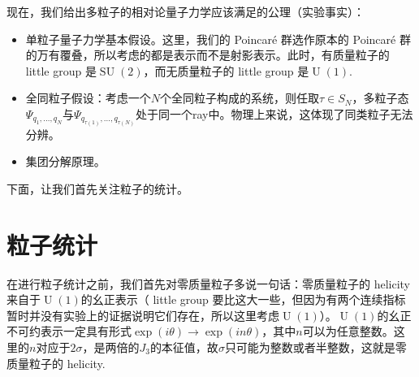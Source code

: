 \documentclass[11pt]{article}
\theoremstyle{definition}
\theoremstyle{plain}
\newtheorem{lem}[para]{Lemma}
\begin{document}
现在，我们给出多粒子的相对论量子力学应该满足的公理（实验事实）：
\begin{itemize}
\item 单粒子量子力学基本假设。这里，我们的 Poincar\'{e} 群选作原本的 Poincar\'{e} 群的万有覆叠，所以考虑的都是表示而不是射影表示。此时，有质量粒子的 little group 是$\operatorname{SU}(2)$，而无质量粒子的 little group 是$\operatorname{U}(1)$.
\item 全同粒子假设：考虑一个$N$个全同粒子构成的系统，则任取$\tau \in S_N$，多粒子态$\Psi_{q_1,\dots,q_N}$与$\Psi_{q_{\tau(1)},\dots,q_{\tau(N)}}$处于同一个ray中。物理上来说，这体现了同类粒子无法分辨。
\item 集团分解原理。
\end{itemize}
下面，让我们首先关注粒子的统计。

\section{粒子统计}




在进行粒子统计之前，我们首先对零质量粒子多说一句话：零质量粒子的 helicity 来自于$\operatorname{U}(1)$的幺正表示（ little group 要比这大一些，但因为有两个连续指标暂时并没有实验上的证据说明它们存在，所以这里考虑$\operatorname{U}(1)$）。$\operatorname{U}(1)$的幺正不可约表示一定具有形式$\exp(i\theta)\to \exp(in\theta)$，其中$n$可以为任意整数。这里的$n$对应于$2\sigma$，是两倍的$J_3$的本征值，故$\sigma$只可能为整数或者半整数，这就是零质量粒子的 helicity. 
\end{document}
